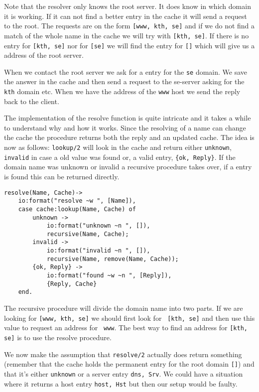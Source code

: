 \documentclass[a4paper, 11pt]{article}
\begin{document}
Note that the resolver only knows the root server. It does know in
which domain it is working. If it can not find a better entry in the
cache it will send a request to the root. The requests are on the
form {\tt [www, kth, se]} and if we do not find a match of the whole
name in the cache we will try with {\tt [kth, se]}. If there is no
entry for {\tt [kth, se]} nor for {\tt [se]} we will find the entry for
{\tt []} which will give us a address of the root server. 

When we contact the root server we ask for a entry for the {\tt se}
domain. We save the answer in the cache and then send a request to the
se-server asking for the {\tt kth} domain etc. When we have the
address of the {\tt www} host we send the reply back to the client.

The implementation of the resolve function is quite intricate and it
takes a while to understand why and how it works. Since the resolving
of a name can change the cache the procedure returns both the reply
and an updated cache.  The idea is now as follows: {\tt lookup/2} will
look in the cache and return either {\tt unknown}, {\tt invalid} in
case a old value was found or, a valid entry, {\tt \{ok, Reply\}}. If
the domain name was unknown or invalid a recursive procedure takes
over, if a entry is found this can be returned directly.

\begin{verbatim}
resolve(Name, Cache)->
    io:format("resolve ~w ", [Name]),
    case cache:lookup(Name, Cache) of
        unknown ->
            io:format("unknown ~n ", []),
            recursive(Name, Cache);
        invalid ->
            io:format("invalid ~n ", []),
            recursive(Name, remove(Name, Cache));
        {ok, Reply} ->
            io:format("found ~w ~n ", [Reply]),
            {Reply, Cache}
    end.

\end{verbatim}

The recursive procedure will divide the domain name into two parts. If
we are looking for {\tt [www, kth, se]} we should first look for {\tt
[kth, se]} and then use this value to request an address for {\tt
www}. The best way to find an address for {\tt [kth, se]} is to use
the resolve procedure.

We now make the assumption that {\tt resolve/2} actually does return
something (remember that the cache holds the permanent entry for the
root domain {\tt []}) and that it's either {\tt unknown} or a server
entry {\tt {dns, Srv}}. We could have a situation where it returns a
host entry {\tt {host, Hst}} but then our setup would be faulty. 
\end{document}
